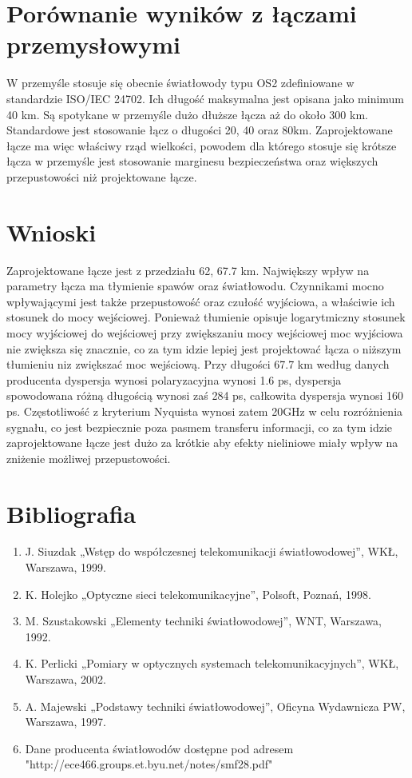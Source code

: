 \documentclass[paper=a4, fontsize=11pt]{scrartcl} %
\numberwithin{equation}{section} %
\numberwithin{figure}{section} %
\numberwithin{table}{section} %
\begin{document}
\section { Porównanie wyników z łączami przemysłowymi}

W przemyśle stosuje się obecnie światłowody typu OS2 zdefiniowane w standardzie ISO/IEC 24702. Ich długość maksymalna jest opisana jako
minimum 40 km. Są spotykane w przemyśle dużo dłuższe łącza aż do około 300 km. Standardowe jest stosowanie łącz o długości 20, 40 oraz 80km.
Zaprojektowane łącze ma więc właściwy rząd wielkości, powodem dla którego stosuje się krótsze łącza w przemyśle jest stosowanie marginesu bezpieczeństwa
oraz większych przepustowości niż projektowane łącze.


\section { Wnioski }

Zaprojektowane łącze jest z przedziału 62, 67.7 km. Największy wpływ na parametry łącza ma tłymienie spawów oraz światłowodu.
Czynnikami mocno wpływającymi jest także przepustowość oraz czułość wyjściowa, a właściwie ich stosunek do mocy wejściowej.
Ponieważ tłumienie opisuje logarytmiczny stosunek mocy wyjściowej do wejściowej przy zwiększaniu mocy wejściowej moc wyjściowa nie zwiększa się
znacznie, co za tym idzie lepiej jest projektować łącza o niższym tłumieniu niz zwiększać moc wejściową. Przy długości 67.7 km według danych producenta
dyspersja wynosi polaryzacyjna wynosi 1.6 ps, dyspersja spowodowana różną długością wynosi zaś 284 ps, całkowita dyspersja wynosi 160 ps. Częstotliwość
z kryterium Nyquista wynosi zatem 20GHz w celu rozróżnienia sygnału, co jest bezpiecznie poza pasmem transferu informacji, co za tym idzie zaprojektowane
łącze jest dużo za krótkie aby efekty nieliniowe miały wpływ na zniżenie możliwej przepustowości.

\section { Bibliografia }

\begin{enumerate}
 \item J. Siuzdak „Wstęp do współczesnej telekomunikacji światłowodowej”, WKŁ, Warszawa, 1999.
 \item K. Holejko „Optyczne sieci telekomunikacyjne”, Polsoft, Poznań, 1998.
 \item M. Szustakowski „Elementy techniki światłowodowej”, WNT, Warszawa, 1992.
 \item K. Perlicki „Pomiary w optycznych systemach telekomunikacyjnych”, WKŁ, Warszawa, 2002.
 \item A. Majewski „Podstawy techniki światłowodowej”, Oficyna Wydawnicza PW, Warszawa, 1997.
 \item Dane producenta światłowodów dostępne pod adresem \\
   "http://ece466.groups.et.byu.net/notes/smf28.pdf"
\end{enumerate}
\end{document}
